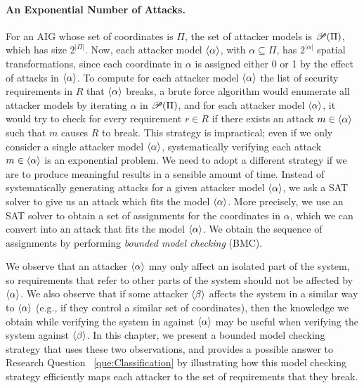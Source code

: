 \paragraph{An Exponential Number of Attacks.} For an AIG whose set of coordinates is $\Pi$, the set of attacker models is ${{\mathscr{P}}\!\left({\Pi}\right)}$, which has size $2^{|\Pi|}$. Now, each attacker model ${{\left<\alpha\right>}}$, with $\alpha\subseteq \Pi$, has $2^{|\alpha|}$ spatial transformations, since each coordinate in $\alpha$ is assigned either 0 or 1 by the effect of attacks in ${{\left<\alpha\right>}}$. To compute for each attacker model ${{\left<\alpha\right>}}$ the list of security requirements in ${R}$ that ${{\left<\alpha\right>}}$ breaks, a brute force algorithm would enumerate all attacker models by iterating $\alpha$ in ${{\mathscr{P}}\!\left({\Pi}\right)}$, and for each attacker model ${{\left<\alpha\right>}}$, it would try to check for every requirement $r\in {R}$ if there exists an attack $m\in {{\left<\alpha\right>}}$ such that $m$ causes $R$ to break. This strategy is impractical; even if we only consider a single attacker model ${{\left<\alpha\right>}}$, systematically verifying each attack $m\in {{\left<\alpha\right>}}$ is an exponential problem. We need to adopt a different strategy if we are to produce meaningful results in a sensible amount of time. Instead of systematically generating attacks for a given attacker model ${{\left<\alpha\right>}}$, we ask a SAT solver to give us an attack which fits the model ${{\left<\alpha\right>}}$. More precisely, we use an SAT solver to obtain a set of assignments for the coordinates in $\alpha$, which we can convert into an attack that fits the model ${{\left<\alpha\right>}}$. 
We obtain the sequence of assignments by performing \emph{bounded model checking} (BMC). 
 
We observe that an attacker ${{\left<\alpha\right>}}$ may only affect an isolated part of the system, so requirements that refer to other parts of the system should not be affected by ${{\left<\alpha\right>}}$. We also observe that if some attacker ${{\left<\beta\right>}}$ affects the system in a similar way to ${{\left<\alpha\right>}}$ (e.g., if they control a similar set of coordinates), then the knowledge we obtain while verifying the system in against ${{\left<\alpha\right>}}$ may be useful when verifying the system against ${{\left<\beta\right>}}$. In this chapter, we present a bounded model checking strategy that uses these two observations, and provides a possible answer to Research Question ~\ref{que:Classification} by illustrating how this model checking strategy efficiently maps each attacker to the set of requirements that they break.

